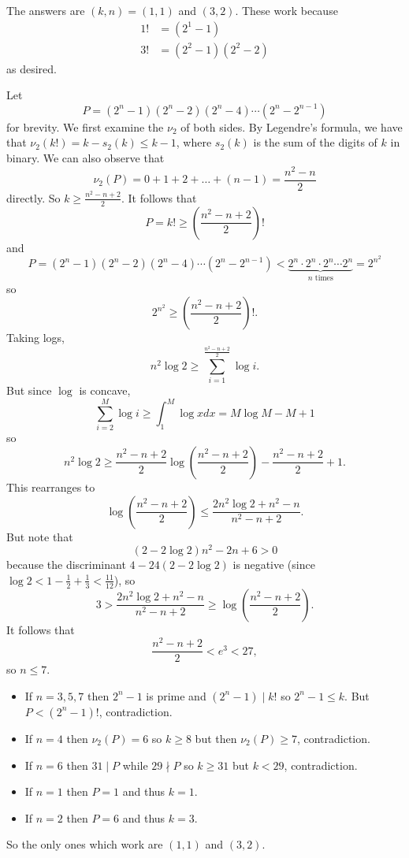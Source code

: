 The answers are $(k,n)=(1,1)$ and $(3,2)$. These work because
\begin{align*}
	1!&=(2^1-1)\\
	3!&=(2^2-1)(2^2-2)
\end{align*}
as desired.

Let \[P=(2^n-1)(2^n-2)(2^n-4)\cdots(2^n-2^{n-1})\] for brevity. We first examine the $\nu_2$ of both sides. By Legendre's formula, we have that $\nu_2(k!)=k-s_2(k)\leq k-1$, where $s_2(k)$ is the sum of the digits of $k$ in binary. We can also observe that \[\nu_2(P)=0+1+2+\ldots+(n-1)=\frac{n^2-n}{2}\] directly. So $k\geq\frac{n^2-n+2}{2}$. It follows that \[P=k!\geq\left(\frac{n^2-n+2}{2}\right)!\] and \[P=(2^n-1)(2^n-2)(2^n-4)\cdots(2^n-2^{n-1})<\underbrace{2^n\cdot2^n\cdot2^n\cdots2^n}_{n\text{ times}}=2^{n^2}\] so \[2^{n^2}\geq\left(\frac{n^2-n+2}{2}\right)!.\] Taking logs, \[n^2\log2\geq\sum_{i=1}^{\frac{n^2-n+2}{2}}\log i.\] But since $\log$ is concave, \[\sum_{i=2}^M\log i\geq\int_1^M\log xdx=M\log M-M+1\] so \[n^2\log2\geq\frac{n^2-n+2}{2}\log\left(\frac{n^2-n+2}{2}\right)-\frac{n^2-n+2}{2}+1.\] This rearranges to \[\log\left(\frac{n^2-n+2}{2}\right)\leq\frac{2n^2\log2+n^2-n}{n^2-n+2}.\] But note that \[(2-2\log2)n^2-2n+6>0\] because the discriminant $4-24(2-2\log2)$ is negative (since $\log2<1-\frac{1}{2}+\frac{1}{3}<\frac{11}{12}$), so \[3>\frac{2n^2\log2+n^2-n}{n^2-n+2}\geq\log\left(\frac{n^2-n+2}{2}\right).\] It follows that \[\frac{n^2-n+2}{2}<e^3<27,\] so $n\leq7$.
\begin{itemize}
	\item If $n=3,5,7$ then $2^n-1$ is prime and $(2^n-1)\mid k!$ so $2^n-1\leq k$. But $P<(2^n-1)!$, contradiction.
	\item If $n=4$ then $\nu_2(P)=6$ so $k\geq8$ but then $\nu_2(P)\geq7$, contradiction.
	\item If $n=6$ then $31\mid P$ while $29\nmid P$ so $k\geq31$ but $k<29$, contradiction.
	\item If $n=1$ then $P=1$ and thus $k=1$.
	\item If $n=2$ then $P=6$ and thus $k=3$.
\end{itemize}
So the only ones which work are $(1,1)$ and $(3,2)$.